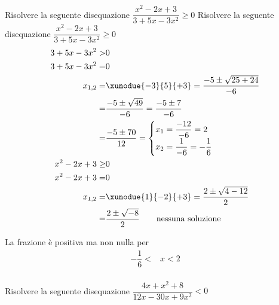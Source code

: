 \begin{exercise}
		Risolvere la seguente disequazione $\dfrac{x^2-2x+3}{3+5x-3x^2}\geq 0$
\tcblower
Risolvere la seguente disequazione $\dfrac{x^2-2x+3}{3+5x-3x^2}\geq 0$
\begin{align*}
3+5x-3x^2>&0\\
3+5x-3x^2=&0\\
x_{1,2}=&\xunodue{-3}{5}{+3}=\dfrac{-5\pm\sqrt{25+24}}{-6}\\
=&\dfrac{-5\pm\sqrt{49}}{-6}=\dfrac{-5\pm 7}{-6}\\
=&\dfrac{-5\pm 70}{12}=\begin{cases}
x_1=\dfrac{-12}{-6}=2\\
x_2=\dfrac{1}{-6}=-\dfrac{1}{6}
\end{cases}\\
x^2-2x+3\geq&0\\
x^2-2x+3=&0\\
x_{1,2}=&\xunodue{1}{-2}{+3}=\dfrac{2\pm\sqrt{4-12}}{2}\\
=&\dfrac{2\pm\sqrt{-8}}{2}
\qquad\text{nessuna soluzione}\\
\end{align*}
\begin{center}
	
\end{center}
La frazione è positiva ma non nulla per 
\begin{align*}
-\dfrac{1}{6}<&x<2\\
\end{align*}
\end{exercise}
\begin{exercise}[no solution]
		Risolvere la seguente disequazione $\dfrac{4x+x^2+8}{12x-30x+9x^2}< 0$
\end{exercise}

